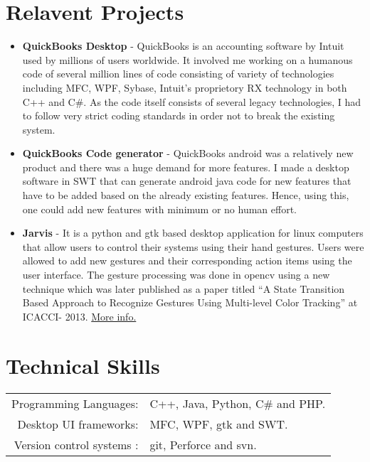 \documentclass[a4paper,10pt]{article} %
\begin{document}
\section{Relavent Projects}
\begin{itemize}
 \item \textbf{QuickBooks Desktop} - QuickBooks is an accounting software by Intuit used by millions of users worldwide. It involved me working on a humanous code of several million lines of code consisting of variety of technologies including MFC, WPF, Sybase, Intuit's proprietory RX technology in both C++ and C\#. As the code itself consists of several legacy technologies, I had to follow very strict coding standards in order not to break the existing system.
 \item \textbf{QuickBooks Code generator} - QuickBooks android was a relatively new product and there was a huge demand for more features. I made a desktop software in SWT that can generate android java code for new features that have to be added based on the already existing features. Hence, using this, one could add new features with minimum or no human effort.
 \item \textbf{Jarvis} - It is a python and gtk based desktop application for linux computers that allow users to control their systems using their hand gestures. Users were allowed to add new gestures and their corresponding action items using the user interface. The gesture processing was done in opencv using a new technique which was later published as a paper titled ``A State Transition Based Approach to Recognize Gestures Using Multi-level Color Tracking'' at ICACCI- 2013. \href{https://github.com/alseambusher/jarvis}{More info.}
\end{itemize}


\section{Technical Skills}
\renewcommand{\arraystretch}{1}%
\begin{tabular}{rl}

Programming Languages: &  C++, Java, Python, C\# and PHP.\\
Desktop UI frameworks: & MFC, WPF, gtk and SWT.\\
Version control systems : & git, Perforce and svn.

\end{tabular}
\end{document}
